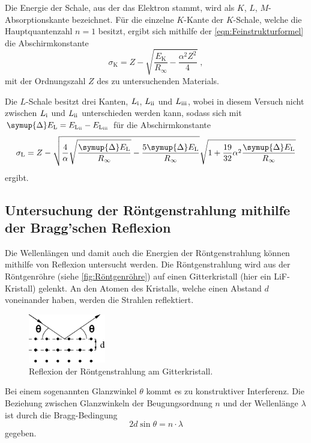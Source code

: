     Die Energie der Schale,
    aus der das Elektron stammt,
    wird als $K$, $L$, $M$-Absorptionskante bezeichnet.
    Für die einzelne $K$-Kante der $K$-Schale,
    welche die Hauptquantenzahl $n=1$ besitzt,
    ergibt sich mithilfe der \autoref{eqn:Feinstrukturformel} die Abschirmkonstante
    \begin{equation}
        \label{eqn:SigmaK}
        \sigma_\text{K} = Z - \sqrt{\frac{E_\text{K}}{R_\infty} - \frac{\alpha^2 Z^2}{4}} \; ,
    \end{equation}
    mit der Ordnungszahl $Z$ des zu untersuchenden Materials.

    \newcommand{\romansub}[1]{\mathrm{\uppercase\expandafter{\romannumeral #1}}}

    Die $L$-Schale besitzt drei Kanten,
    $L_{\romansub{1}}$, $L_{\romansub{2}}$ und $L_{\romansub{3}}$,
    wobei in diesem Versuch nicht zwischen $L_{\romansub{1}}$ und $L_{\romansub{2}}$ unterschieden werden kann,
    sodass sich mit $\symup{\Delta} E_\text{L} = E_{\text{L}_{\romansub{2}}} - E_{\text{L}_{\romansub{3}}}$
    für die Abschirmkonstante
    \begin{equation}
        \sigma_\text{L} = Z - \sqrt{\frac{4}{\alpha}
        \sqrt{\frac{\symup{\Delta}E_\text{L}}{R_\infty}} - \frac{5\symup{\Delta}E_\text{L}}{R_\infty}}
        \sqrt{1 + \frac{19}{32}\alpha^2 \frac{\symup{\Delta}E_\text{L}}{R_\infty}}
    \end{equation}
    ergibt.


\subsection{Untersuchung der Röntgenstrahlung mithilfe der Bragg'schen Reflexion}

    Die Wellenlängen und damit auch die Energien der Röntgenstrahlung können mithilfe von Reflexion untersucht werden.
    Die Röntgenstrahlung wird aus der Röntgenröhre (siehe \autoref{fig:Röntgenröhre}) auf einen Gitterkristall (hier ein LiF-Kristall) gelenkt.
    An den Atomen des Kristalls,
    welche einen Abstand $d$ voneinander haben,
    werden die Strahlen reflektiert.
    \begin{figure}
        \centering
        \includegraphics[width=0.3\textwidth]{content/img/Abb_3.pdf}
        \caption{Reflexion der Röntgenstrahlung am Gitterkristall. \cite{versuchsanleitung}}
        \label{fig:BraggReflexion}
    \end{figure}

    Bei einem sogenannten Glanzwinkel $\theta$ kommt es zu konstruktiver Interferenz.
    Die Beziehung zwischen Glanzwinkeln der Beugungsordnung $n$ und der Wellenlänge $\lambda$
    ist durch die Bragg-Bedingung
    \begin{equation}
        \label{eqn:BraggBedingung}
        2 d \sin{\theta} = n \cdot \lambda
    \end{equation}
    gegeben.
